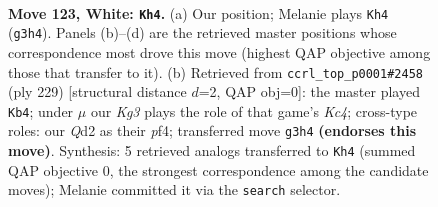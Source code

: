 \documentclass[11pt]{article}
\begin{document}
\begin{figure}[p]\centering
\begin{subfigure}{0.46\textwidth}\centering
\resizebox{\linewidth}{!}{%
\newchessgame
\chessboard[
  setfen={5k2/8/8/8/8/6K1/3Q4/8 w - - 25 123},
  showmover=false,
  pgfstyle=straightmove, color=movearrow, markmove={g3-h4}
]}
\caption{}
\end{subfigure}\hfill
\begin{subfigure}{0.46\textwidth}\centering
\resizebox{\linewidth}{!}{%
\newchessgame
\chessboard[
  setfen={8/8/8/2k5/5P2/8/8/1K6 b - - 1 115},
  showmover=false,
  pgfstyle=straightmove, color=movearrow, markmove={c5-b4}
]}
\caption{}
\end{subfigure}
\\[4pt]

\caption{\textbf{Move 123, White: \texttt{Kh4}.} (a) Our position; Melanie plays \texttt{Kh4} (\texttt{g3h4}). Panels (b)--(d) are the retrieved master positions whose correspondence most drove this move (highest QAP objective among those that transfer to it). (b) Retrieved from \texttt{ccrl\_top\_p0001\#2458} (ply 229) [structural distance $d$=2, QAP obj=0]: the master played \texttt{Kb4}; under $\mu$ our \emph{Kg3} plays the role of that game's \emph{Kc4}; cross-type roles: our \emph{Q}d2 as their \emph{p}f4; transferred move \texttt{g3h4} \textbf{(endorses this move)}. Synthesis: 5 retrieved analogs transferred to \texttt{Kh4} (summed QAP objective 0, the strongest correspondence among the candidate moves); Melanie committed it via the \texttt{search} selector.}
\label{fig:thought-m244}
\end{figure}

\clearpage
\end{document}
